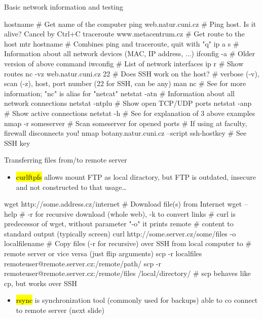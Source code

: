 \documentclass[compress, ucs, xelatex, 11pt, xcolor=svgnames,
  hyperref={
    bookmarks=true,
    unicode=true,
    colorlinks=true,
    pdftitle={Linux, command line and MetaCentrum},
    plainpages=false,
    pdfauthor={Vojtech Zeisek},
    pdfsubject={Course about use of Linux command line, writing shell scripts and using MetaCentrum of CESNET},
    pdfcreator={XeLaTeX},
    pdfkeywords={Linux, GNU, BASH, shell, command line, MetaCentrum},
    linkcolor=Red,
    anchorcolor=Blue,
    citecolor=Purple,
    filecolor=DodgerBlue,
    menucolor=DarkOrchid,
    urlcolor=DeepSkyBlue,
    pdftex},
  url={hyphens, lowtilde} %
  ]{beamer}
\renewcommand{\texttt}[1]{\hl{\ttfamily #1}}
\begin{document}
\begin{frame}[fragile]{Basic network information and testing}
  \begin{bashcode}
    hostname # Get name of the computer
    ping web.natur.cuni.cz # Ping host. Is it alive? Cancel by Ctrl+C
    traceroute www.metacentrum.cz # Get route to the host
    mtr hostname # Combines ping and traceroute, quit with "q"
    ip a s # Information about all network devices (MAC, IP address, ...)
    ifconfig -a # Older version of above command
    iwconfig # List of network interfaces
    ip r # Show routes
    nc -vz web.natur.cuni.cz 22 # Does SSH work on the host?
      # verbose (-v), scan (-z), host, port number (22 for SSH, can be any)
    man nc # See for more information; "nc" is alias for "netcat"
    netstat -atn # Information about all network connections
    netstat -ntplu # Show open TCP/UDP ports
    netstat -anp # Show active connections
    netstat -h # See for explanation of 3 above examples
    nmap -r someserver # Scan someserver for opened ports
                       # If using at faculty, firewall disconnects you!
    nmap botany.natur.cuni.cz --script ssh-hostkey # See SSH key
  \end{bashcode}
\end{frame}

\begin{frame}[fragile]{Transferring files from/to remote server}
  \begin{itemize}
    \item \texttt{curlftpfs} allows mount FTP as local diractory, but FTP is outdated, insecure and not constructed to that usage\ldots
  \end{itemize}
  \begin{bashcode}
    wget http://some.address.cz/internet # Download file(s) from Internet
    wget --help # -r for recursive download (whole web), -k to convert links
    # curl is predecessor of wget, without parameter "-o" it prints remote
    # content to standard output (typically screen)
    curl http://some.server.cz/some/files -o localfilename
    # Copy files (-r for recursive) over SSH from local computer to
    # remote server or vice versa (just flip arguments)
    scp -r localfiles remoteuser@remote.server.cz:/remote/path/
    scp -r remoteuser@remote.server.cz:/remote/files /local/directory/
    # scp behaves like cp, but works over SSH
  \end{bashcode}
  \begin{itemize}
    \item \texttt{rsync} is synchronization tool (commonly used for backups) able to co connect to remote server (next slide)
  \end{itemize}
\end{frame}
\end{document}
